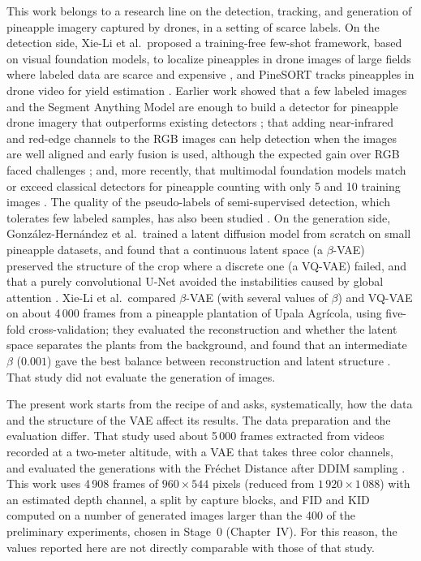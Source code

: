 This work belongs to a research line on the detection, tracking, and generation of pineapple imagery captured by drones, in a setting of scarce labels. On the detection side, Xie-Li et al.\ proposed a training-free few-shot framework, based on visual foundation models, to localize pineapples in drone images of large fields where labeled data are scarce and expensive \cite{XieLi2024}, and PineSORT tracks pineapples in drone video for yield estimation \cite{XieLi2025PineSORT}. Earlier work showed that a few labeled images and the Segment Anything Model are enough to build a detector for pineapple drone imagery that outperforms existing detectors \cite{Fallas2023}; that adding near-infrared and red-edge channels to the RGB images can help detection when the images are well aligned and early fusion is used, although the expected gain over RGB faced challenges \cite{Gonzalez2023MS}; and, more recently, that multimodal foundation models match or exceed classical detectors for pineapple counting with only 5 and 10 training images \cite{Fallas2026Count}. The quality of the pseudo-labels of semi-supervised detection, which tolerates few labeled samples, has also been studied \cite{Fallas2025Pseudo}. On the generation side, Gonz\'alez-Hern\'andez et al.\ trained a latent diffusion model from scratch on small pineapple datasets, and found that a continuous latent space (a $\beta$-VAE) preserved the structure of the crop where a discrete one (a VQ-VAE) failed, and that a purely convolutional U-Net avoided the instabilities caused by global attention \cite{Gonzalez2026}. Xie-Li et al.\ compared $\beta$-VAE (with several values of $\beta$) and VQ-VAE on about 4\,000 frames from a pineapple plantation of Upala Agr\'icola, using five-fold cross-validation; they evaluated the reconstruction and whether the latent space separates the plants from the background, and found that an intermediate $\beta$ ($0.001$) gave the best balance between reconstruction and latent structure \cite{XieLi2025VAE}. That study did not evaluate the generation of images.

The present work starts from the recipe of \cite{Gonzalez2026} and asks, systematically, how the data and the structure of the VAE affect its results. The data preparation and the evaluation differ. That study used about 5\,000 frames extracted from videos recorded at a two-meter altitude, with a VAE that takes three color channels, and evaluated the generations with the Fr\'echet Distance after DDIM sampling \cite{Gonzalez2026}. This work uses 4\,908 frames of $960\times544$ pixels (reduced from $1\,920\times1\,088$) with an estimated depth channel, a split by capture blocks, and FID and KID computed on a number of generated images larger than the 400 of the preliminary experiments, chosen in Stage~0 (Chapter~IV). For this reason, the values reported here are not directly comparable with those of that study.

